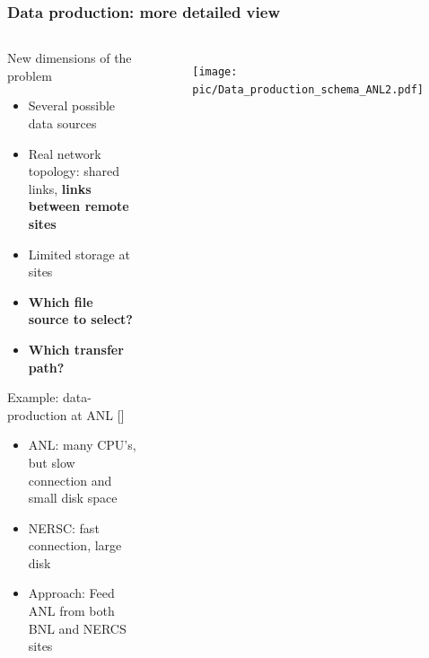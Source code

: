 \documentclass{beamer}
\begin{document}
\begin{frame}\frametitle{Data production: more detailed view}
 	\begin{columns}[c] %
    \begin{footnotesize}
    \vspace{-10mm}
	\begin{block}{New dimensions of the problem}	
		\begin{itemize}		
			\item Several possible data sources
			\item Real network topology: shared links, \textbf{links between remote sites}
			\item Limited storage at sites
			\item \textbf{Which file source to select?}
			\item \textbf{Which transfer path?}

		\end{itemize}
 	\end{block}
		\begin{block}{Example: data-production at ANL  \textcolor{black}{[\cite{Balewski}]}}	
		\begin{itemize}
			\item ANL: many CPU's, but slow connection and small disk space
			\item NERSC: fast connection, large disk
			\item Approach: Feed ANL from both BNL and NERCS sites		

		\end{itemize}
 	\end{block}
 	\end{footnotesize} 
		\begin{figure}
			\begin{center}
			    \vspace{-5mm}
				\texttt{[image: pic/Data\_production\_schema\_ANL2.pdf]}
			\end{center}
			\end{figure} 	 	
 	\end{columns}
\end{frame}
\end{document}
